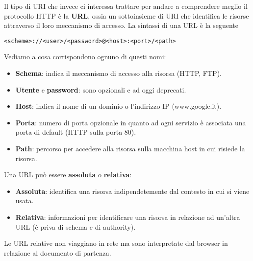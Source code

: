 Il tipo di URI che invece ci interessa trattare per andare a comprendere meglio il protocollo HTTP
è la \textbf{URL}, ossia un sottoinsieme di URI che identifica le risorse attraverso il loro
meccanismo di accesso. La sintassi di una URL è la seguente
\begin{center} \verb|<scheme>://<user>/<password>@<host>:<port>/<path>| \end{center}
Vediamo a cosa corrispondono ognuno di questi nomi:
\begin{itemize}
	\item \textbf{Schema}: indica il meccanismo di accesso alla risorsa (HTTP, FTP).
	\item \textbf{Utente} e \textbf{password}: sono opzionali e ad oggi deprecati.
	\item \textbf{Host}: indica il nome di un dominio o l'indirizzo IP (www.google.it).
	\item \textbf{Porta}: numero di porta opzionale in quanto ad ogni servizio è associata una
		porta di default (HTTP sulla porta 80).
	\item \textbf{Path}: percorso per accedere alla risorsa sulla macchina host in cui risiede la
		risorsa.
\end{itemize}
Una URL può essere \textbf{assoluta} o \textbf{relativa}:
\begin{itemize}
	\item \textbf{Assoluta}: identifica una risorsa indipendetemente dal contesto in cui si viene
		usata.
	\item \textbf{Relativa}: informazioni per identificare una risorsa in relazione ad un'altra 
		URL (è priva di schema e di authority).
\end{itemize}
Le URL relative non viaggiano in rete ma sono interpretate dal browser in relazione al documento
di partenza.
